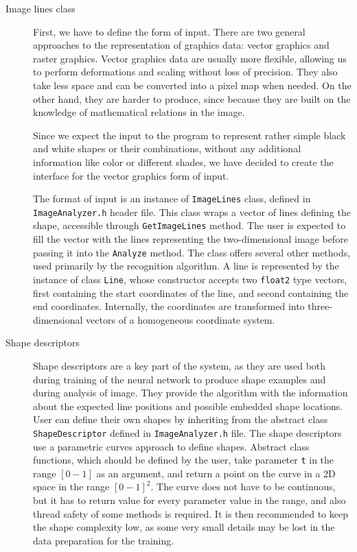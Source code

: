 \begin{description}
\item [Image lines class]
First, we have to define the form of input. There are two general approaches to the representation of graphics data: vector graphics and raster graphics. Vector graphics data are usually more flexible, allowing us to perform deformations and scaling without loss of precision. They also take less space and can be converted into a pixel map when needed. On the other hand, they are harder to produce, since because they are built on the knowledge of mathematical relations in the image. 

Since we expect the input to the program to represent rather simple black and white shapes or their combinations, without any additional information like color or different shades, we have decided to create the interface for the vector graphics form of input.

The format of input is an instance of \texttt{ImageLines} class, defined in \texttt{ImageAnalyzer.h} header file. This class wraps a vector of lines defining the shape, accessible through \texttt{GetImageLines} method. The user is expected to fill the vector with the lines representing the two-dimensional image before passing it into the \texttt{Analyze} method. The class offers several other methods, used primarily by the recognition algorithm. 
A line is represented by the instance of class \texttt{Line}, whose constructor accepts two \texttt{float2} type vectors, first containing the start coordinates of the line, and second containing the end coordinates. Internally, the coordinates are transformed into three-dimensional vectors of a homogeneous coordinate system. 

\item [Shape descriptors]
Shape descriptors are a key part of the system, as they are used both during training of the neural network to produce shape examples and during analysis of image. They provide the algorithm with the information about the expected line positions and possible embedded shape locations. User can define their own shapes by inheriting from the abstract class \texttt{ShapeDescriptor} defined in \texttt{ImageAnalyzer.h} file. The shape descriptors use a parametric curves approach to define shapes. Abstract class functions, which should be defined by the user, take parameter \texttt{t} in the range $[0-1]$ as an argument, and return a point on the curve in a 2D space in the range $[0-1]^2$. The curve does not have to be continuous, but it has to return value for every parameter value in the range, and also thread safety of some methods is required. It is then recommended to keep the shape complexity low, as some very small details may be lost in the data preparation for the training. 


\end{description}
